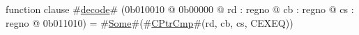 function clause #\hyperref[zdecode]{decode}# (0b010010 @ 0b00000 @ rd : regno @ cb : regno @ cs : regno @ 0b011010) = #\hyperref[zSome]{Some}#(#\hyperref[zCPtrCmp]{CPtrCmp}#(rd, cb, cs, CEXEQ))
